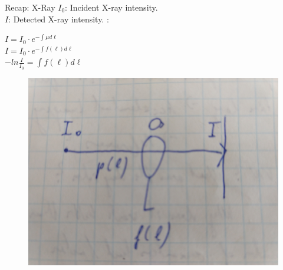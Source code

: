  \begin{frame}{Recap: X-Ray}
    $I_0$: Incident X-ray intensity. \\
    $I$: Detected X-ray intensity.
    \vskip12pt
    :\\
    \begin{center}
     \vskip6pt
        $I=I_0\cdot e^{-\int \mu d\ell}$\\
        \vskip6pt
        $I=I_0\cdot e^{-\int f(\ell) d\ell}$\\
        \vskip6pt
        $-ln \frac{I}{I_0} = \int f(\ell) d\ell$
    \end{center}

	\begin{figure}[tbp]
		\centering
		\includegraphics[height=0.3\textheight]{images/x_ray_sketch}
		\label{fig:x_ray_sketch}
	\end{figure}	
 \end{frame}
 
